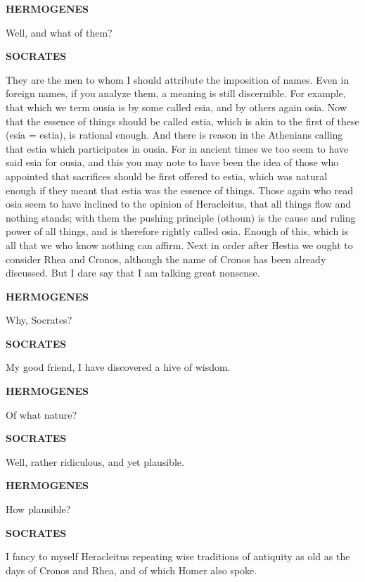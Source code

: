 \documentclass[11pt,letter]{article}
\begin{document}
\par \textbf{HERMOGENES}
\par   Well, and what of them?

\par \textbf{SOCRATES}
\par   They are the men to whom I should attribute the imposition of names. Even in foreign names, if you analyze them, a meaning is still discernible. For example, that which we term ousia is by some called esia, and by others again osia. Now that the essence of things should be called estia, which is akin to the first of these (esia = estia), is rational enough. And there is reason in the Athenians calling that estia which participates in ousia. For in ancient times we too seem to have said esia for ousia, and this you may note to have been the idea of those who appointed that sacrifices should be first offered to estia, which was natural enough if they meant that estia was the essence of things. Those again who read osia seem to have inclined to the opinion of Heracleitus, that all things flow and nothing stands; with them the pushing principle (othoun) is the cause and ruling power of all things, and is therefore rightly called osia. Enough of this, which is all that we who know nothing can affirm. Next in order after Hestia we ought to consider Rhea and Cronos, although the name of Cronos has been already discussed. But I dare say that I am talking great nonsense.

\par \textbf{HERMOGENES}
\par   Why, Socrates?

\par \textbf{SOCRATES}
\par   My good friend, I have discovered a hive of wisdom.

\par \textbf{HERMOGENES}
\par   Of what nature?

\par \textbf{SOCRATES}
\par   Well, rather ridiculous, and yet plausible.

\par \textbf{HERMOGENES}
\par   How plausible?

\par \textbf{SOCRATES}
\par   I fancy to myself Heracleitus repeating wise traditions of antiquity as old as the days of Cronos and Rhea, and of which Homer also spoke.
\end{document}
